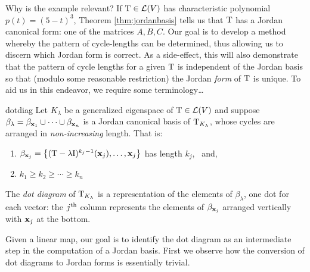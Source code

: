 Why is the example relevant? If $\mathrm{T}\in\mathcal{L}(V)$ has characteristic polynomial $p(t)=(5-t)^3$, Theorem \ref{thm:jordanbasis} tells us that $\mathrm{T}$ has a Jordan canonical form: one of the matrices $A,B,C$. Our goal is to develop a method whereby the pattern of cycle-lengths can be determined, thus allowing us to discern which Jordan form is correct. As a side-effect, this will also demonstrate that the pattern of cycle lengths for a given $\mathrm{T}$ is independent of the Jordan basis so that (modulo some reasonable restriction) the Jordan \emph{form} of $\mathrm{T}$ is unique. To aid us in this endeavor, we require some terminology\ldots


\pagebreak[3]


\begin{defn}{}{dotdiag}
	Let $K_\lambda$ be a generalized eigenspace of $\mathrm{T}\in\mathcal{L}(V)$ and suppose  $\beta_\lambda=\beta_{{\mathbf{x}}_1}\cup\cdots\cup\beta_{{\mathbf{x}}_n}$ is a Jordan canonical basis of $\mathrm{T}_{K_\lambda}$, whose cycles are arranged in \emph{non-increasing} length. That is:
	\begin{enumerate}
	  \item $\beta_{{\mathbf{x}}_j}=\big\{(\mathrm{T}-\lambda \mathrm{I})^{k_j-1}({\mathbf{x}}_j),\ldots,{\mathbf{x}}_j\big\}$ has length $k_j$, \ and,
	  \item $k_1\ge k_2\ge\cdots\ge k_n$
	\end{enumerate}
	The \emph{dot diagram} of $\mathrm{T}_{K_\lambda}$ is a representation of the elements of $\beta_\lambda$, one dot for each vector: the $j\textsuperscript{th}$ column represents the elements of $\beta_{{\mathbf{x}}_j}$ arranged vertically with ${\mathbf{x}}_j$ at the bottom.
\end{defn}

Given a linear map, our goal is to identify the dot diagram as an intermediate step in the computation of a Jordan basis. First we observe how the conversion of dot diagrams to Jordan forms is essentially trivial.

